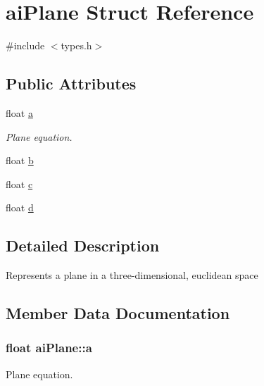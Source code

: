 \hypertarget{structai_plane}{\section{ai\-Plane Struct Reference}
\label{structai_plane}
}


{\ttfamily \#include $<$types.\-h$>$}

\subsection*{Public Attributes}
\begin{DoxyCompactItemize}
\item 
float \hyperlink{structai_plane_aeadf64e70e6daf1f7f431c90cfc8bce1}{a}
\begin{DoxyCompactList}\small\item\em Plane equation. \end{DoxyCompactList}\item 
float \hyperlink{structai_plane_a84ab33cd9b2f5325282b489f8a2bf11c}{b}
\item 
float \hyperlink{structai_plane_a7b0ea36c355ca003a5789088fb24da1f}{c}
\item 
float \hyperlink{structai_plane_ab8696b583b6fab46ae30cd5b691e7c9a}{d}
\end{DoxyCompactItemize}


\subsection{Detailed Description}
Represents a plane in a three-\/dimensional, euclidean space 

\subsection{Member Data Documentation}
\hypertarget{structai_plane_aeadf64e70e6daf1f7f431c90cfc8bce1}{
\subsubsection[{a}]{\setlength{\rightskip}{0pt plus 5cm}float ai\-Plane\-::a}}\label{structai_plane_aeadf64e70e6daf1f7f431c90cfc8bce1}


Plane equation. 

